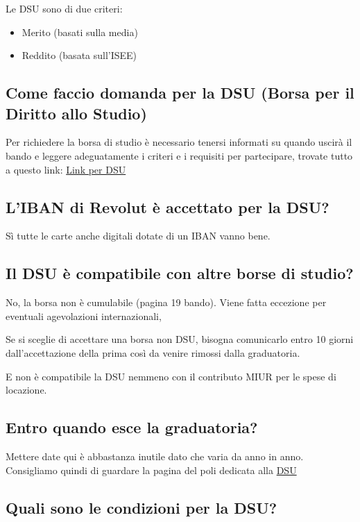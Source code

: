 \documentclass[legal]{polinetwork}
\begin{document}
Le DSU sono di due criteri:

\begin{itemize}
  \item Merito (basati sulla media)
  \item Reddito (basata sull'ISEE)
\end{itemize}


\subsection{Come faccio domanda per la DSU (Borsa per il Diritto allo Studio)}


Per richiedere la borsa di studio è necessario tenersi informati su quando uscirà il bando e leggere adeguatamente i criteri e i requisiti per partecipare, trovate tutto a questo link: \href{https://www.polimi.it/studenti/tasse-borse-e-agevolazioni/diritto-allo-studio}{Link per DSU}

\subsection{L'IBAN di Revolut è accettato per la DSU?}


Sì tutte le carte anche digitali dotate di un IBAN vanno bene.

\subsection{Il DSU è compatibile con altre borse di studio?}


No, la borsa non è cumulabile (pagina 19 bando). Viene fatta eccezione per eventuali agevolazioni internazionali,

Se si sceglie di accettare una borsa non DSU, bisogna comunicarlo entro 10 giorni dall’accettazione della prima così da venire rimossi dalla graduatoria.

E non è compatibile la DSU nemmeno con il contributo MIUR per le spese di locazione.


\subsection{Entro quando esce la graduatoria?}


Mettere date qui è abbastanza inutile dato che varia da anno in anno. Consigliamo quindi di guardare la pagina del poli dedicata alla \href{https://www.polimi.it/studenti/tasse-borse-e-agevolazioni/diritto-allo-studio}{DSU}

\subsection{Quali sono le condizioni per la DSU?}
\end{document}
